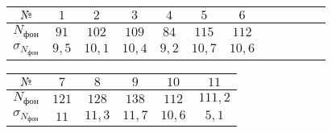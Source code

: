 \begin{tabular}{| c | c | c | c | c | c | c | c | c | c | c | c |}
\hline
$№$ & $1$ & $2$ & $3$ & $4$ & $5$ & $6$\\
\hline
$N_{\text{фон}}$ & $91$ & $102$ & $109$ & $84$ & $115$ & $112$\\
\hline
$\sigma_{N_{\text{фон}}}$ & $9,5$ & $10,1$ & $10,4$ & $9,2$ & $10,7$ & $10,6$ \\
\hline
\end{tabular}

\begin{tabular}{| c | c | c | c | c | c |}
\hline
$№$ & $7$ & $8$ & $9$ & $10$ & $11$\\
\hline
$N_{\text{фон}}$ & $121$ & $128$ & $138$ & $112$ & $111,2$\\
\hline
$\sigma_{N_{\text{фон}}}$ & $11$ & $11,3$ & $11,7$ & $10,6$ & $5,1$\\
\hline
\end{tabular}